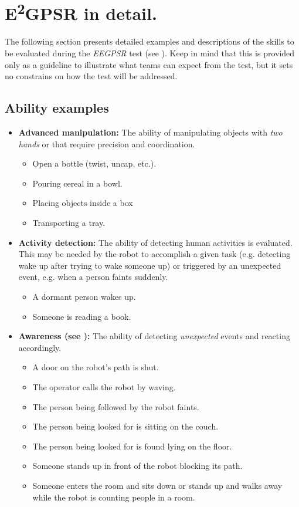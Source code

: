 \chapter[EEGPSR in detail]{E\textsuperscript{2}GPSR in detail.}
\label{chap:eegpsr-appendix}

The following section presents detailed examples and descriptions of the skills to be evaluated during the \textit{EEGPSR} test (see ). Keep in mind that this is provided only as a guideline to illustrate what teams can expect from the test, but it sets no constrains on how the test will be addressed.

\section{Ability examples}
\begin{itemize}
	\item \textbf{Advanced manipulation:} The ability of manipulating objects with \textit{two hands} or that require precision and coordination.
	\begin{itemize}
		\item Open a bottle (twist, uncap, etc.).
		\item Pouring cereal in a bowl.
		\item Placing objects inside a box
		\item Transporting a tray.
	\end{itemize}

	\item \textbf{Activity detection:} The ability of detecting human activities is evaluated. This may be needed by the robot to accomplish a given task (e.g. detecting wake up after trying to wake someone up) or triggered by an unexpected event, e.g. when a person faints suddenly. 
	\begin{itemize}
		\item A dormant person wakes up.
		\item Someone is reading a book.
	\end{itemize}

	\item \textbf{Awareness (see ):} The ability of detecting \textit{unexpected} events and reacting accordingly.
	\begin{itemize}
		\item A door on the robot's path is shut.
		\item The operator calls the robot by waving.
		\item The person being followed by the robot faints.
		\item The person being looked for is sitting on the couch.
		\item The person being looked for is found lying on the floor.
		\item Someone stands up in front of the robot blocking its path.
		\item Someone enters the room and sits down or stands up and walks away while the robot is counting people in a room.
	\end{itemize}


\end{itemize}
